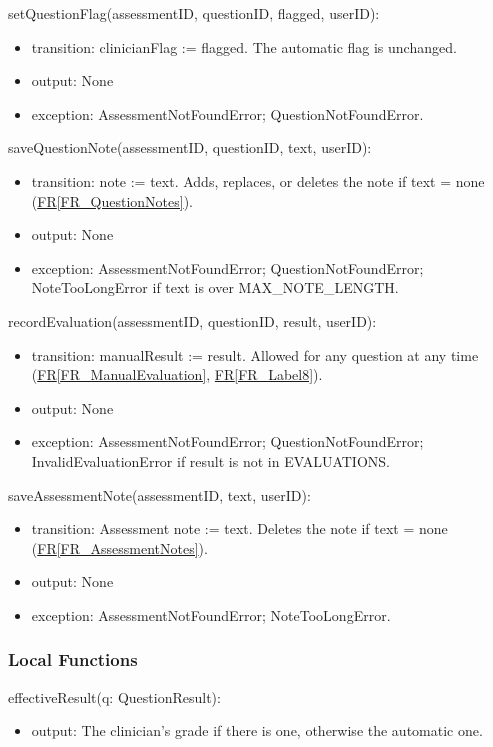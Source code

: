 \documentclass[12pt, titlepage]{article}
\newcommand{\srsref}[2]{\href{https://github.com/Nour-Fawaz/MacaBoca/blob/main/pdfs/SRS/SRS.pdf}{#1\ref*{#2}}}
\begin{document}
\noindent setQuestionFlag(assessmentID, questionID, flagged, userID):
\begin{itemize}
\item transition: clinicianFlag := flagged. The automatic flag is unchanged.
\item output: None
\item exception: AssessmentNotFoundError; QuestionNotFoundError.
\end{itemize}

\noindent saveQuestionNote(assessmentID, questionID, text, userID):
\begin{itemize}
\item transition: note := text. Adds, replaces, or deletes the note if text = none (\srsref{FR}{FR_QuestionNotes}).
\item output: None
\item exception: AssessmentNotFoundError; QuestionNotFoundError; NoteTooLongError if text is over MAX\_NOTE\_LENGTH.
\end{itemize}

\noindent recordEvaluation(assessmentID, questionID, result, userID):
\begin{itemize}
\item transition: manualResult := result. Allowed for any question at any time (\srsref{FR}{FR_ManualEvaluation}, \srsref{FR}{FR_Label8}).
\item output: None
\item exception: AssessmentNotFoundError; QuestionNotFoundError; InvalidEvaluationError if result is not in EVALUATIONS.
\end{itemize}

\noindent saveAssessmentNote(assessmentID, text, userID):
\begin{itemize}
\item transition: Assessment note := text. Deletes the note if text = none (\srsref{FR}{FR_AssessmentNotes}).
\item output: None
\item exception: AssessmentNotFoundError; NoteTooLongError.
\end{itemize}

\subsubsection{Local Functions}

\noindent effectiveResult(q: QuestionResult):
\begin{itemize}
\item output: The clinician's grade if there is one, otherwise the automatic one.
\end{itemize}
\end{document}
